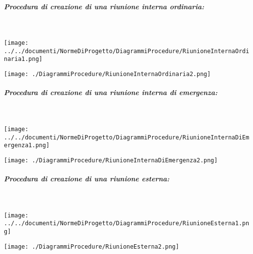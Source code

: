 \begin{samepage}
	\subparagraph{Procedura di creazione di una riunione interna ordinaria:}\mbox{}\\
	
	\begin{center}
		\texttt{[image: ../../documenti/NormeDiProgetto/DiagrammiProcedure/RiunioneInternaOrdinaria1.png]}
	\end{center}
\end{samepage}

\begin{center}
	\texttt{[image: ./DiagrammiProcedure/RiunioneInternaOrdinaria2.png]}
\end{center}

\begin{samepage}
	\subparagraph{Procedura di creazione di una riunione interna di emergenza:}\mbox{}\\
	
	\begin{center}
		\texttt{[image: ../../documenti/NormeDiProgetto/DiagrammiProcedure/RiunioneInternaDiEmergenza1.png]}
	\end{center}
\end{samepage}

\begin{center}
	\texttt{[image: ./DiagrammiProcedure/RiunioneInternaDiEmergenza2.png]}
\end{center}

\begin{samepage}
	\subparagraph{Procedura di creazione di una riunione esterna:}\mbox{}\\
	
	\begin{center}
		\texttt{[image: ../../documenti/NormeDiProgetto/DiagrammiProcedure/RiunioneEsterna1.png]}
	\end{center}
\end{samepage}

\begin{center}
	\texttt{[image: ./DiagrammiProcedure/RiunioneEsterna2.png]}
\end{center}

